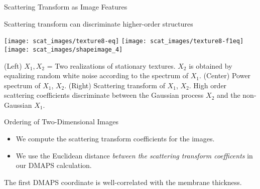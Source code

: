 \begin{frame}{Scattering Transform as Image Features}
\begin{minipage}{0.4\textwidth}
\begin{block}{{\small Scattering transform can discriminate higher-order structures \par}}
\texttt{[image: scat\_images/texture8-eq]}
\texttt{[image: scat\_images/texture8-f1eq]}
\texttt{[image: scat\_images/shapeimage\_4]}\\
{\tiny (Left) $X_1, X_2$ = Two realizations of stationary textures. $X_2$ is obtained by equalizing random white noise according to the spectrum of $X_1$. (Center) Power spectrum of $X_1$, $X_2$. (Right) Scattering transform of $X_1$, $X_2$. High order scattering coefficients discriminate between the Gaussian process $X_2$ and the non-Gaussian $X_1$. \par}
\end{block}

\end{minipage}

\end{frame}

\begin{frame}{Ordering of Two-Dimensional Images}

	{\small 
	\begin{itemize}
		\item We compute the scattering transform coefficients for the images.
		\item We use the Euclidean distance {\em between the scattering transform coefficents} in our DMAPS calculation.
	\end{itemize}
    \par}
    
    \centering
	
	The first DMAPS coordinate is well-correlated with the membrane thickness.
    
\end{frame}

    
    

    